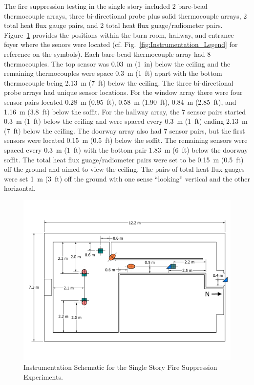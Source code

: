 \documentclass[12pt,oneside]{book}
\begin{document}
The fire suppression testing in the single story included 2 bare-bead thermocouple arrays, three bi-directional probe plus solid thermocouple arrays, 2 total heat flux gauge pairs, and 2 total heat flux guage/radiometer pairs. Figure~\ref{fig:Fire_Suppression_Instrumentation_Dimensions} provides the positions within the burn room, hallway, and entrance foyer where the senors were located (cf. Fig.~\ref{fig:Instrumentation_Legend} for reference on the symbols). Each bare-bead thermocouple array had 8 thermocouples. The top sensor was 0.03~m (1~in) below the ceiling and the remaining thermocouples were space 0.3~m (1~ft) apart with the bottom thermocouple being 2.13~m (7~ft) below the ceiling. The three bi-directional probe arrays had unique sensor locations. For the window array there were four sensor pairs located 0.28~m (0.95~ft), 0.58~m (1.90~ft), 0.84~m (2.85~ft), and 1.16~m (3.8~ft) below the soffit. For the hallway array, the 7 sensor pairs started 0.3~m (1~ft) below the ceiling and were spaced every 0.3~m (1~ft) ending 2.13~m (7~ft) below the ceiling. The doorway array also had 7 sensor pairs, but the first sensors were located 0.15~m (0.5~ft) below the soffit. The remaining sensors were spaced every 0.3~m (1~ft) with the bottom pair 1.83~m (6~ft) below the doorway soffit. The total heat flux guage/radiometer pairs were set to be 0.15~m (0.5~ft) off the ground and aimed to view the ceiling. The pairs of total heat flux guages were set 1~m (3~ft) off the ground with one sense ``looking'' vertical and the other horizontal.

\begin{figure}[!ht]
	\includegraphics[width=\columnwidth]{../Figures/Floor_Plans/PDFs/East_Structure/DelCo_2012_East_Structure_Instrumentation}
	\caption{Instrumentation Schematic for the Single Story Fire Suppression Experiments.}
	\label{fig:Fire_Suppression_Instrumentation_Dimensions}
\end{figure}
\end{document}
